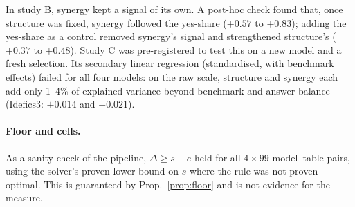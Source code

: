 \begin{table}[t]
\centering
\caption{Partial rank correlations of EMAP drop. Study B controls for the other measure and accuracy. Study C additionally controls for yes-share. Values are correlations with 95\% bootstrap intervals over tables.}
\label{tab:partial_corr}
\end{table}


\noindent
In study B, synergy kept a signal of its own. A post-hoc check found that, once structure was
fixed, synergy followed the yes-share ($+0.57$ to $+0.83$); adding the yes-share as a control
removed synergy's signal and strengthened structure's ($+0.37$ to $+0.48$). Study C was
pre-registered to test this on a new model and a fresh selection. Its secondary linear
regression (standardised, with benchmark effects) failed for all four models: on the raw
scale, structure and synergy each add only 1--4\% of explained variance beyond benchmark and
answer balance (Idefics3: $+0.014$ and $+0.021$).

\paragraph{Floor and cells.}
As a sanity check of the pipeline, $\Delta\ge s-e$ held for all $4\times99$ model--table pairs, using the solver's
proven lower bound on $s$ where the rule was not proven optimal. This is guaranteed by Prop.~\ref{prop:floor} and is
not evidence for the measure.

